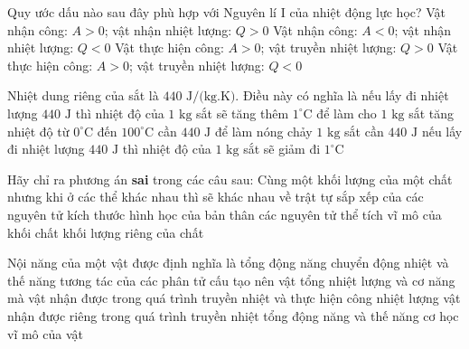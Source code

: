 \begin{ex}	Quy ước dấu nào sau đây phù hợp với Nguyên lí I của nhiệt động lực học?
	\choice
	{\True Vật nhận công: $A>0$; vật nhận nhiệt lượng: $Q>0$}
	{Vật nhận công: $A<0$; vật nhận nhiệt lượng: $Q<0$}
	{Vật thực hiện công: $A>0$; vật truyền nhiệt lượng: $Q>0$}
	{Vật thực hiện công: $A>0$; vật truyền nhiệt lượng: $Q<0$}
\end{ex}

\begin{ex}	Nhiệt dung riêng của sắt là $440\text{ J/(kg.K)}$. Điều này có nghĩa là
	\choice
	{nếu lấy đi nhiệt lượng $440\text{ J}$ thì nhiệt độ của $1\text{ kg}$ sắt sẽ tăng thêm $1^\circ\text{C}$}
	{để làm cho $1\text{ kg}$ sắt tăng nhiệt độ từ $0^\circ\text{C}$ đến $100^\circ\text{C}$ cần $440\text{ J}$}
	{để làm nóng chảy $1\text{ kg}$ sắt cần $440\text{ J}$}
	{\True nếu lấy đi nhiệt lượng $440\text{ J}$ thì nhiệt độ của $1\text{ kg}$ sắt sẽ giảm đi $1^\circ\text{C}$}
\end{ex}

\begin{ex}	Hãy chỉ ra phương án \textbf{sai} trong các câu sau: Cùng một khối lượng của một chất nhưng khi ở các thể khác nhau thì sẽ khác nhau về
	\choice
	{trật tự sắp xếp của các nguyên tử}
	{\True kích thước hình học của bản thân các nguyên tử}
	{thể tích vĩ mô của khối chất}
	{khối lượng riêng của chất}
\end{ex}

\begin{ex}	Nội năng của một vật được định nghĩa là
	\choice
	{\True tổng động năng chuyển động nhiệt và thế năng tương tác của các phân tử cấu tạo nên vật}
	{tổng nhiệt lượng và cơ năng mà vật nhận được trong quá trình truyền nhiệt và thực hiện công}
	{nhiệt lượng vật nhận được riêng trong quá trình truyền nhiệt}
	{tổng động năng và thế năng cơ học vĩ mô của vật}
\end{ex}

